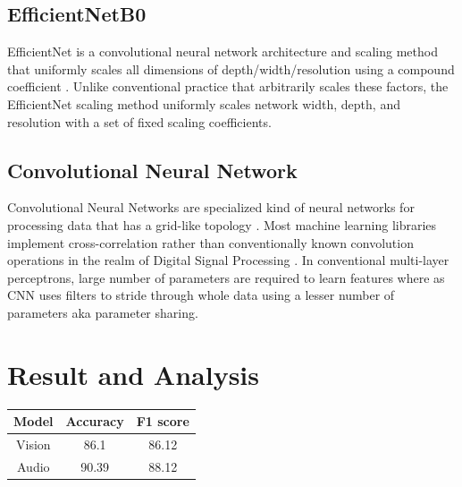 \documentclass[fleqn, 10pt, twoside]{IOEGC}
\begin{document}
\subsection{EfficientNetB0}
EfficientNet is a convolutional neural network architecture and scaling method that uniformly scales all dimensions of depth/width/resolution using a compound coefficient \cite{r7}.
Unlike conventional practice that arbitrarily scales these factors, the EfficientNet scaling method uniformly scales network width, depth, and resolution with a set of fixed scaling
coefficients.
\par
\subsection{ Convolutional Neural Network}
Convolutional Neural Networks are specialized kind of neural networks for processing
data that has a grid-like topology \cite{r8}. Most machine learning libraries implement cross-correlation rather than conventionally known convolution operations in the realm of Digital
Signal Processing . In conventional multi-layer perceptrons, large number of parameters are required to learn features where as CNN uses filters to stride through whole data using a lesser number of parameters aka parameter sharing.

\section{Result and Analysis}

\begin{center}
	\begin{tabular}{ |c|c|c| }
		\hline
		Model  & Accuracy & F1 score \\
		\hline
		Vision & 86.1     & 86.12    \\
		\hline
		Audio  & 90.39    & 88.12    \\
		\hline
	\end{tabular}
	\label{table:overview}
\end{center}
\end{document}
